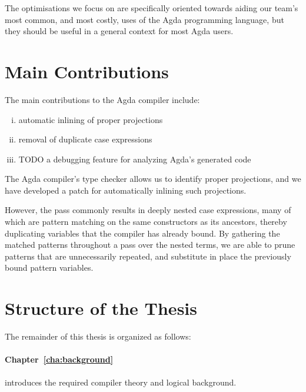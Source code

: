 The optimisations we focus on are specifically oriented towards aiding our team's most common, and most costly, uses of the Agda programming language, but they should be useful in a general context for most Agda users.


\section{Main Contributions}
\label{sec:main_contributions}

The main contributions to the Agda compiler include:
\begin{enumerate}[(i)]
	\item automatic inlining of proper projections
	\item removal of duplicate case expressions
	\item TODO a debugging feature for analyzing Agda's generated code
\end{enumerate}

The Agda compiler's type checker allows us to identify proper projections, and we have developed a patch for automatically inlining such projections.

However, the pass commonly results in deeply nested case expressions, many of which are pattern matching on the same constructors as its ancestors, thereby duplicating variables that the compiler has already bound. By gathering the matched patterns throughout a pass over the nested terms, we are able to prune patterns that are unnecessarily repeated, and substitute in place the previously bound pattern variables.


\section{Structure of the Thesis}
\label{sec:structure_of_the_thesis}

The remainder of this thesis is organized as follows:

\paragraph{Chapter~\ref{cha:background}} introduces the required compiler theory and logical background.

